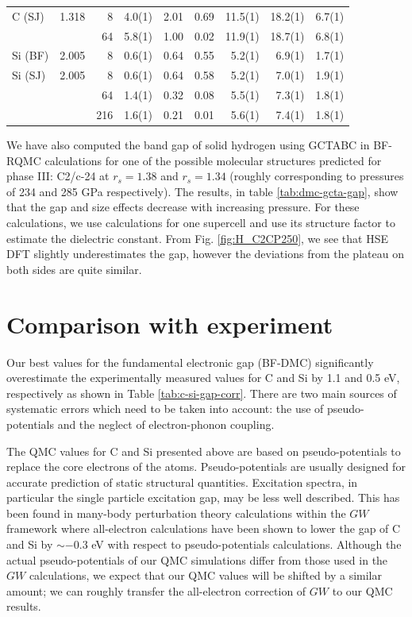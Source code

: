\begin{table}
\begin{tabular}{lrrrrrrrr}
\hline
C (SJ) & 1.318 &   8 & 4.0(1) & 2.01 & 0.69 & 11.5(1) & 18.2(1) & 6.7(1) \\
  &  &  64 & 5.8(1)   & 1.00 & 0.02 & 11.9(1) & 18.7(1) & 6.8(1) \\
\hline
Si (BF) & 2.005 &   8 & 0.6(1) & 0.64 & 0.55 & 5.2(1) & 6.9(1) & 1.7(1) \\
\hline
Si (SJ) & 2.005 &   8 & 0.6(1) & 0.64 & 0.58 &  5.2(1) &  7.0(1) & 1.9(1) \\
 &  &  64 & 1.4(1)   & 0.32 & 0.08 &  5.5(1) &  7.3(1) & 1.8(1) \\
 &  & 216 & 1.6(1)   & 0.21 & 0.01 &  5.6(1) &  7.4(1) & 1.8(1) \\
\hline
\hline
\end{tabular}
\end{table}

We have also computed the band gap of solid hydrogen using GCTABC in BF-RQMC calculations
for one of the possible
molecular structures predicted for phase III: C2/c-24 at $r_s = 1.38$ and $r_s=1.34$ (roughly corresponding  to pressures of 234 and 285 GPa respectively). The results, in table \ref{tab:dmc-gcta-gap}, show that the gap and size effects decrease with increasing pressure.
For these calculations, we use calculations for one supercell and use its structure factor to estimate the dielectric constant.  From Fig. \ref{fig:H_C2CP250}, we see that
 HSE DFT slightly underestimates the gap, however the deviations from the plateau on both sides are quite similar.

\section{Comparison with experiment}
\label{sec:bg-compare}

Our best values for the fundamental electronic gap (BF-DMC)  significantly overestimate the experimentally measured values for C and Si  by 1.1 and 0.5 eV, respectively as shown in Table \ref{tab:c-si-gap-corr}. There are two main sources of systematic errors which need to be taken into account: the use of pseudo-potentials and the neglect of electron-phonon coupling.

The QMC values for C and Si presented above are based on pseudo-potentials to replace the 
core electrons of the atoms. Pseudo-potentials are usually designed for accurate prediction of
static structural quantities. Excitation spectra, in particular the single particle excitation gap,
may be less well described.
This has been found in many-body perturbation theory calculations within the $GW$ framework
where all-electron calculations have been shown to lower the gap of C and Si by $\sim -0.3$ eV
\cite{Wu02,GomezAbal08}
with respect to  pseudo-potentials calculations.
Although the actual pseudo-potentials of our QMC simulations differ from those used in the
$GW$ calculations, 
we expect that our QMC values will be shifted by a similar amount; we can roughly transfer
the all-electron correction of $GW$ to our QMC results.

